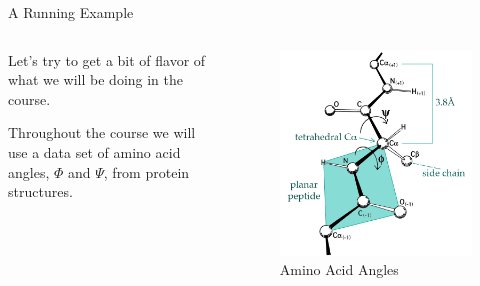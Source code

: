 \documentclass[
  ignorenonframetext,
  aspectratio=1610,
  onlytextwidth]{beamer}
\begin{document}
\begin{frame}{A Running Example}
\label{a-running-example}
\begin{columns}[T]
\begin{column}{0.47\linewidth}
Let's try to get a bit of flavor of what we will be doing in the course.

\bigskip

\pause

Throughout the course we will use a data set of amino acid angles,
\(\Phi\) and \(\Psi\), from protein structures.
\end{column}

\begin{column}{0.47\linewidth}
\begin{figure}[H]

{\centering \includegraphics[width=1\linewidth,height=\textheight,keepaspectratio]{../images/PhiPsi_creative.jpg}

}

\caption{Amino Acid Angles}

\end{figure}%
\end{column}
\end{columns}
\end{frame}
\end{document}
